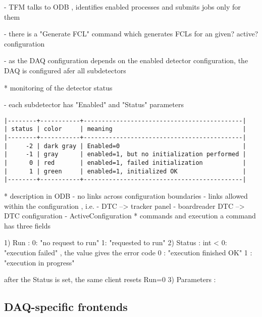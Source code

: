   - TFM talks to ODB , identifies enabled processes and submits jobs only
    for them

  - there is a "Generate FCL" command which generates FCLs
    for an given? active? configuration

- as the DAQ configuration depends on the enabled detector configuration,
  the DAQ is configured afer all subdetectors 


* monitoring of the detector status                                          

- each subdetector has "Enabled" and "Status" parameters
\begin{verbatim}
|--------+-----------+--------------------------------------------|
| status | color     | meaning                                    |
|--------+-----------+--------------------------------------------|
|     -2 | dark gray | Enabled=0                                  |
|     -1 | gray      | enabled=1, but no initialization performed |
|      0 | red       | enabled=1, failed initialization           |
|      1 | green     | enabled=1, initialized OK                  |
|--------+-----------+--------------------------------------------|
\end{verbatim}

* description in ODB                                                         
- no links across configuration boundaries
- links allowed within the configuration , i.e.
  - DTC --> tracker panel
  - boardreader DTC --> DTC configuration
- ActiveConfiguration
* commands and execution
 a command has three fields
 
1) Run     : 0: "no request to run"  1: "requested to run" 
2) Status  : int
   < 0: "execution failed" , the value gives the error code
   0  : "execution finished OK"
   1  : "execution in progress"

   after the Status is set, the same client resets Run=0
3) Parameters :


\subsection{DAQ-specific frontends}

